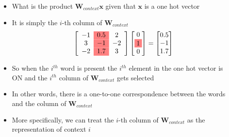 \begin{frame}
	\begin{columns}
		\begin{overlayarea}{\textwidth}{\textheight}
			
		\end{overlayarea}
		\begin{overlayarea}{\textwidth}{\textheight}
				\footnotesize{
					\begin{itemize}
						\justifying
						\item<1-> What is the product $\mathbf{W}_{context} \mathbf{x} $ given that $\mathbf{x}$ is a one hot vector
						\item<2-> It is simply the $i$-th column of $\mathbf{W}_{context}$
						      \begin{equation*}
							      \left[\begin{array}{c>{\columncolor{red!50}}cc}
								      -1 & 0.5 & 2  \\
								      3  & -1  & -2 \\
								      -2 & 1.7 & 3
							      \end{array}\right]
							      \begin{bmatrix}
								      0 \\
								      \colorbox{red!50}{1} \\
								      0
							      \end{bmatrix}
							      =\begin{bmatrix}
								      0.5 \\
								      -1  \\
								      1.7
							      \end{bmatrix}
						      \end{equation*}
						\item<3-> So when the $i^{th}$ word is present the $i^{th}$ element in the one hot vector is ON and the $i^{th}$ column of $\mathbf{W}_{context}$ gets selected
						\item<4-> In other words, there is a one-to-one correspondence between the words and the column of $\mathbf{W}_{context}$
						\item<5-> More specifically, we can treat the $i$-th column of $\mathbf{W}_{context}$ as the representation of context $i$
					\end{itemize}
				}
		\end{overlayarea}
	\end{columns}
\end{frame}


